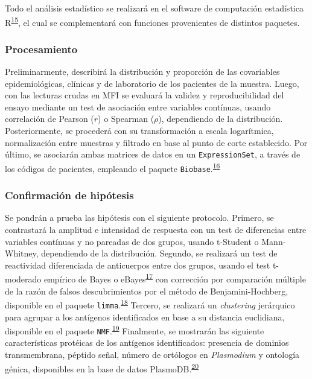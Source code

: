 \documentclass[]{article}
\begin{document}
Todo el análisis estadístico se realizará en el software de computación
estadística R\textsuperscript{\protect\hyperlink{ref-R}{15}}, el cual se
complementará con funciones provenientes de distintos paquetes.

\subsubsection{Procesamiento}\label{procesamiento}

Preliminarmente, describirá la distribución y proporción de las
covariables epidemiológicas, clínicas y de laboratorio de los pacientes
de la muestra. Luego, con las lecturas crudas en MFI se evaluará la
validez y reproducibilidad del ensayo mediante un test de asociación
entre variables contínuas, usando correlación de Pearson (\(r\)) o
Spearman (\(\rho\)), dependiendo de la distribución. Posteriormente, se
procederá con su transformación a escala logarítmica, normalización
entre muestras y filtrado en base al punto de corte establecido. Por
último, se asociarán ambas matrices de datos en un
\texttt{ExpressionSet}, a través de los códigos de pacientes, empleando
el paquete
\texttt{Biobase}.\textsuperscript{\protect\hyperlink{ref-Biobase}{16}}

\subsubsection{Confirmación de
hipótesis}\label{confirmacion-de-hipotesis}

Se pondrán a prueba las hipótesis con el siguiente protocolo. Primero,
se contrastará la amplitud e intensidad de respuesta con un test de
diferencias entre variables contínuas y no pareadas de dos grupos,
usando t-Student o Mann-Whitney, dependiendo de la distribución.
Segundo, se realizará un test de reactividad diferenciada de anticuerpos
entre dos grupos, usando el test t-moderado empírico de Bayes o
eBayes\textsuperscript{\protect\hyperlink{ref-smyth2004ebayes}{17}} con
corrección por comparación múltiple de la razón de falsos
descubrimientos por el método de Benjamini-Hochberg, disponible en el
paquete
\texttt{limma}.\textsuperscript{\protect\hyperlink{ref-limma}{18}}
Tercero, se realizará un \emph{clustering} jerárquico para agrupar a los
antígenos identificados en base a su distancia euclidiana, disponible en
el paquete
\texttt{NMF}.\textsuperscript{\protect\hyperlink{ref-Gaujoux2010NMF}{19}}
Finalmente, se mostrarán las siguiente características protéicas de los
antígenos identificados: presencia de dominios transmembrana, péptido
señal, número de ortólogos en \emph{Plasmodium} y ontología génica,
disponibles en la base de datos
PlasmoDB.\textsuperscript{\protect\hyperlink{ref-plasmodb}{20}}
\end{document}
